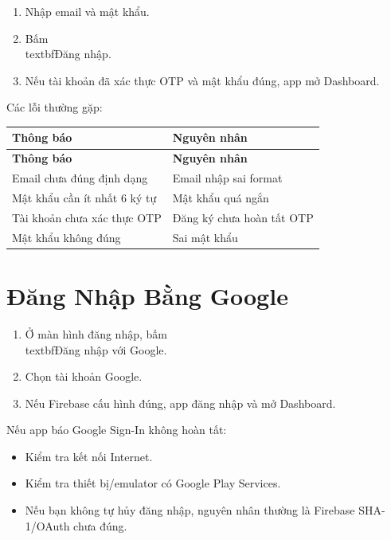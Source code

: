 \documentclass[12pt,a4paper]{report}
\begin{document}
\begin{enumerate}
\item Nhập email và mật khẩu.
\item Bấm \\textbf{Đăng nhập}.
\item Nếu tài khoản đã xác thực OTP và mật khẩu đúng, app mở Dashboard.
\end{enumerate}

Các lỗi thường gặp:

\begin{longtable}{|>{\raggedright\arraybackslash}p{}|>{\raggedright\arraybackslash}p{}|}
\hline
\textbf{Thông báo} & \textbf{Nguyên nhân} \\ \hline
\endfirsthead
\hline
\textbf{Thông báo} & \textbf{Nguyên nhân} \\ \hline
\endhead
Email chưa đúng định dạng & Email nhập sai format \\ \hline
Mật khẩu cần ít nhất 6 ký tự & Mật khẩu quá ngắn \\ \hline
Tài khoản chưa xác thực OTP & Đăng ký chưa hoàn tất OTP \\ \hline
Mật khẩu không đúng & Sai mật khẩu \\ \hline
\end{longtable}

\section{Đăng Nhập Bằng Google}

\begin{enumerate}
\item Ở màn hình đăng nhập, bấm \\textbf{Đăng nhập với Google}.
\item Chọn tài khoản Google.
\item Nếu Firebase cấu hình đúng, app đăng nhập và mở Dashboard.
\end{enumerate}

Nếu app báo Google Sign-In không hoàn tất:

\begin{itemize}
\item Kiểm tra kết nối Internet.
\item Kiểm tra thiết bị/emulator có Google Play Services.
\item Nếu bạn không tự hủy đăng nhập, nguyên nhân thường là Firebase SHA-1/OAuth chưa đúng.
\end{itemize}
\end{document}
